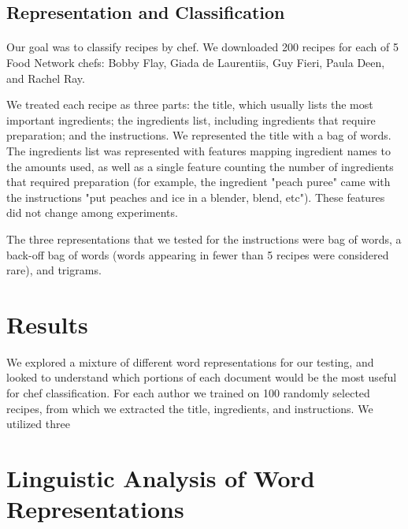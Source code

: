 \documentclass[paper=a4, fontsize=11pt]{scrartcl} %
\begin{document}
\subsection{Representation and Classification}
\paragraph{}
Our goal was to classify recipes by chef.  
We downloaded 200 recipes for each of 5 Food Network chefs: Bobby Flay, Giada de Laurentiis, Guy Fieri, Paula Deen, and Rachel Ray.  

We treated each recipe as three parts: the title, which usually lists the most important ingredients; the ingredients list, including ingredients that require preparation; and the instructions.  We represented the title with a bag of words.  The ingredients list was represented with features mapping ingredient names to the amounts used, as well as a single feature counting the number of ingredients that required preparation (for example, the ingredient "peach puree" came with the instructions "put peaches and ice in a blender, blend, etc").  These features did not change among experiments.

The three representations that we tested for the instructions were bag of words, a back-off bag of words (words appearing in fewer than 5 recipes were considered rare), and trigrams.  


\section{Results}
We explored a mixture of different word representations for our testing, and looked to understand which portions of each document would be the most useful for chef classification.  For each author we trained on 100 randomly selected recipes, from which we extracted the title, ingredients, and instructions.  We utilized three 

\begin{table}

\label{tab:results}
\end{table}





\section{Linguistic Analysis of Word Representations}
\end{document}
